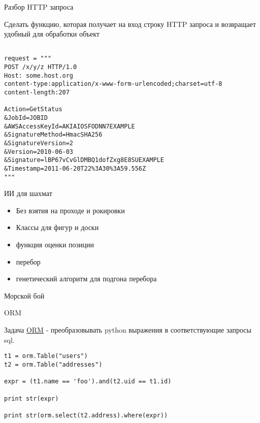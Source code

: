 \documentclass{article}
\begin{document}
\begin{center} Разбор HTTP запроса \end{center}
Сделать функцию, которая получает на вход строку HTTP запроса
и возвращает удобный для обработки объект
\begin{lstlisting}

request = """
POST /x/y/z HTTP/1.0
Host: some.host.org
content-type:application/x-www-form-urlencoded;charset=utf-8
content-length:207

Action=GetStatus
&JobId=JOBID
&AWSAccessKeyId=AKIAIOSFODNN7EXAMPLE
&SignatureMethod=HmacSHA256
&SignatureVersion=2
&Version=2010-06-03
&Signature=lBP67vCvGlDMBQ1dofZxg8E8SUEXAMPLE
&Timestamp=2011-06-20T22%3A30%3A59.556Z
"""

\end{lstlisting}
\newpage

\begin{center} ИИ для шахмат \end{center}
\begin{itemize}
    \item Без взятия на проходе и рокировки
    \item Классы для фигур и доски
    \item функция оценки позиции
    \item перебор
    \item генетический алгоритм для подгона перебора
\end{itemize}
\newpage

\begin{center} Морской бой \end{center}

\newpage

\begin{center} ORM \end{center}
Задача \href{}{ORM} - преобразовывать python выражения в соответствующие 
запросы sql.
\begin{lstlisting}
t1 = orm.Table("users")
t2 = orm.Table("addresses")

expr = (t1.name == 'foo').and(t2.uid == t1.id)

print str(expr)

print str(orm.select(t2.address).where(expr))

\end{lstlisting}
\newpage
\end{document}
